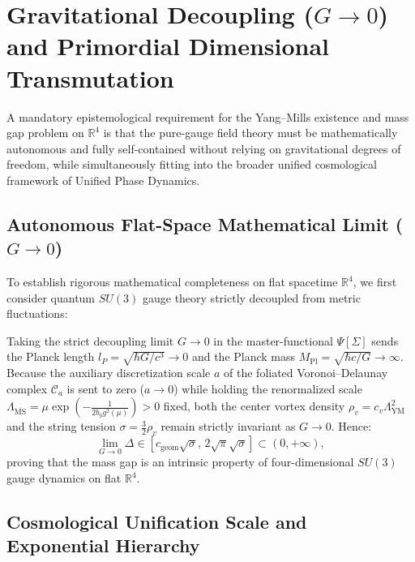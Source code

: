 \documentclass[11pt, a4paper]{article}
\theoremstyle{definition}
\theoremstyle{remark}
\begin{document}
\section{Gravitational Decoupling ($G \to 0$) and Primordial Dimensional Transmutation}

A mandatory epistemological requirement for the Yang--Mills existence and mass gap problem on $\mathbb{R}^{4}$ is that the pure-gauge field theory must be mathematically autonomous and fully self-contained without relying on gravitational degrees of freedom, while simultaneously fitting into the broader unified cosmological framework of Unified Phase Dynamics.

\subsection{Autonomous Flat-Space Mathematical Limit ($G \to 0$)}

To establish rigorous mathematical completeness on flat spacetime $\mathbb{R}^{4}$, we first consider quantum $SU(3)$ gauge theory strictly decoupled from metric fluctuations:

Taking the strict decoupling limit $G \to 0$ in the master-functional $\Psi[\Sigma]$ sends the Planck length $l_{P} = \sqrt{\hbar G/c^{3}} \to 0$ and the Planck mass $M_{\mathrm{Pl}} = \sqrt{\hbar c/G} \to \infty$. Because the auxiliary discretization scale $a$ of the foliated Voronoi--Delaunay complex $\mathcal{C}_{a}$ is sent to zero ($a \to 0$) while holding the renormalized scale $\Lambda_{\overline{\mathrm{MS}}} = \mu \exp\!\left(-\frac{1}{2b_{0}g^{2}(\mu)}\right) > 0$ fixed, both the center vortex density $\rho_{v} = c_{v}\Lambda_{\mathrm{YM}}^{2}$ and the string tension $\sigma = \frac{3}{2}\rho_{v}$ remain strictly invariant as $G \to 0$. Hence:
\begin{equation}
  \lim_{G \to 0} \Delta \in \left[c_{\mathrm{geom}}\sqrt{\sigma},\, 2\sqrt{\pi}\sqrt{\sigma}\right] \subset (0, +\infty),
\end{equation}
proving that the mass gap is an intrinsic property of four-dimensional $SU(3)$ gauge dynamics on flat $\mathbb{R}^{4}$.

\subsection{Cosmological Unification Scale and Exponential Hierarchy}
\end{document}
